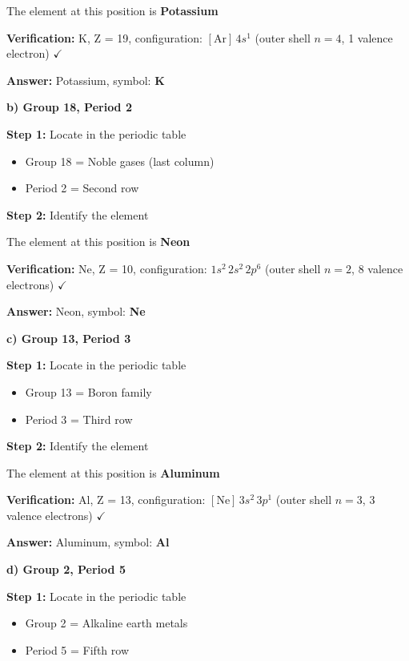 \begin{exercise}
\begin{solu}
        The element at this position is \textbf{Potassium}

        \textbf{Verification:} K, Z = 19, configuration: \([\text{Ar}] \, 4s^1\) (outer shell \(n = 4\), 1 valence electron) \(\checkmark\)

        \textbf{Answer:} Potassium, symbol: \textbf{K}

        \textbf{b) Group 18, Period 2}

        \textbf{Step 1:} Locate in the periodic table
        \begin{itemize}
            \item Group 18 = Noble gases (last column)
            \item Period 2 = Second row
        \end{itemize}

        \textbf{Step 2:} Identify the element

        The element at this position is \textbf{Neon}

        \textbf{Verification:} Ne, Z = 10, configuration: \(1s^2 \, 2s^2 \, 2p^6\) (outer shell \(n = 2\), 8 valence electrons) \(\checkmark\)

        \textbf{Answer:} Neon, symbol: \textbf{Ne}

        \textbf{c) Group 13, Period 3}

        \textbf{Step 1:} Locate in the periodic table
        \begin{itemize}
            \item Group 13 = Boron family
            \item Period 3 = Third row
        \end{itemize}

        \textbf{Step 2:} Identify the element

        The element at this position is \textbf{Aluminum}

        \textbf{Verification:} Al, Z = 13, configuration: \([\text{Ne}] \, 3s^2 \, 3p^1\) (outer shell \(n = 3\), 3 valence electrons) \(\checkmark\)

        \textbf{Answer:} Aluminum, symbol: \textbf{Al}

        \textbf{d) Group 2, Period 5}

        \textbf{Step 1:} Locate in the periodic table
        \begin{itemize}
            \item Group 2 = Alkaline earth metals
            \item Period 5 = Fifth row
        \end{itemize}


\end{solu}
\end{exercise}
